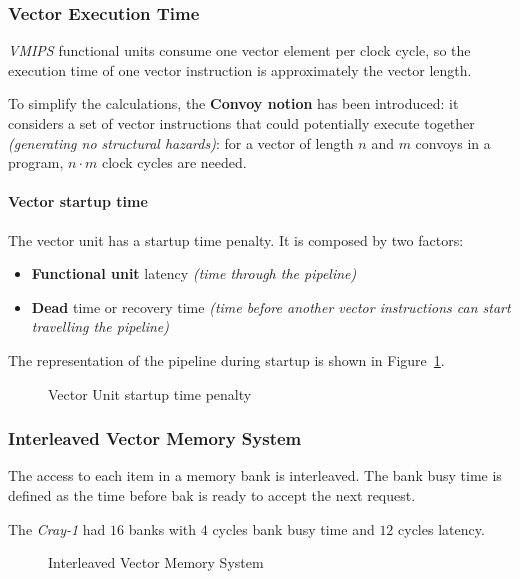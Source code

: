 \documentclass[english]{article}
\begin{document}
\subsubsection{Vector Execution Time}

\textit{VMIPS} functional units consume one vector element per clock cycle, so the execution time of one vector instruction is approximately the vector length.

To simplify the calculations, the \textbf{Convoy notion} has been introduced:
it considers a set of vector instructions that could potentially execute together \textit{(generating no structural hazards)}:
for a vector of length \(n\) and \(m\) convoys in a program, \(n \cdot m\) clock cycles are needed.

\paragraph{Vector startup time}

The vector unit has a startup time penalty.
It is composed by two factors:

\begin{itemize}
  \item \textbf{Functional unit} latency \textit{(time through the pipeline)}
  \item \textbf{Dead} time or recovery time \textit{(time before another vector instructions can start travelling the pipeline)}
\end{itemize}

The representation of the pipeline during startup is shown in Figure~\ref{fig:vector-unit-startup}.

\begin{figure}[htbp]
  \bigskip
  \centering
  \caption{Vector Unit startup time penalty}
  \label{fig:vector-unit-startup}
  \bigskip
\end{figure}

\subsubsection{Interleaved Vector Memory System}

The access to each item in a memory bank is interleaved.
The bank busy time is defined as the time before bak is ready to accept the next request.

The \textit{Cray-1} had \(16\) banks with \(4\) cycles bank busy time and \(12\) cycles latency.

\begin{figure}[htbp]
  \bigskip
  \centering
  \caption{Interleaved Vector Memory System}
  \label{fig:interleaved-vector-memory-system}
  \bigskip
\end{figure}
\end{document}
